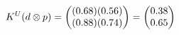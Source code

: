 \documentclass[preview]{standalone}
\begin{document}
\begin{align*}
\special{dvisvgm:raw <g id='unique000'>}K^U(d \otimes p) = \begin{pmatrix} (0.68)(0.56) \\ (0.88)(0.74) \end{pmatrix} = \begin{pmatrix} 0.38 \\ 0.65 \end{pmatrix}\special{dvisvgm:raw </g>}
\end{align*}
\end{document}
